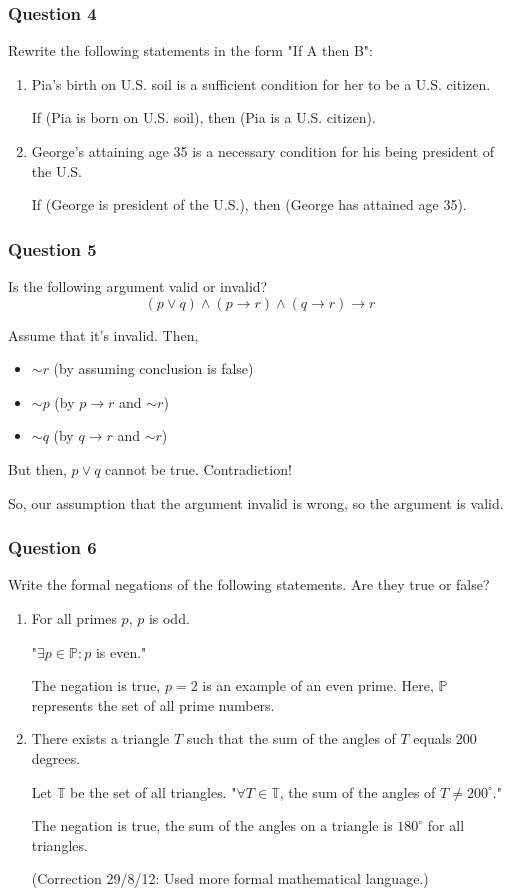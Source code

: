 \documentclass{beamer}
\newcommand{\n}{\sim}
\begin{document}
\begin{frame}
\frametitle{Question 4}
Rewrite the following statements in the form "If A then B":
\begin{enumerate}
\item
Pia's birth on U.S. soil is a sufficient condition for her to be a U.S. citizen.

\pause
If (Pia is born on U.S. soil), then (Pia is a U.S. citizen).

\pause
\item
George's attaining age 35 is a necessary condition for his being president of
the U.S.

\pause
If (George is president of the U.S.), then (George has attained age 35).
\end{enumerate}

\end{frame}

\begin{frame}
\frametitle{Question 5}
Is the following argument valid or invalid?
\[
    (p \lor q) \land (p \to r) \land (q \to r) \to r
\]

\pause
Assume that it's invalid. Then,
\begin{itemize}
\pause
\item $\n r$ (by assuming conclusion is false)
\pause
\item $\n p$ (by $p \to r$ and $\n r$)
\pause
\item $\n q$ (by $q \to r$ and $\n r$)
\end{itemize}
\pause
But then, $p \lor q$ cannot be true. Contradiction!

\pause
So, our assumption that the argument invalid is wrong, so the argument is valid.

\end{frame}

\begin{frame}
\frametitle{Question 6}
Write the formal negations of the following statements. Are they true or false?

\begin{enumerate}
\item
For all primes $p$, $p$ is odd.

\pause
"$\exists p \in \mathbb{P} : p$ is even."

The negation is true, $p = 2$ is an example of an even prime. Here,
$\mathbb{P}$ represents the set of all prime numbers.

\pause
\item
There exists a triangle $T$ such that the sum of the angles of $T$ equals 200
degrees.

\pause
Let $\mathbb{T}$ be the set of all triangles.
"$\forall T \in \mathbb{T}$, the sum of the angles of $T \neq 200^\circ$."

The negation is true, the sum of the angles on a triangle is $180^\circ$ for
all triangles.

(Correction 29/8/12: Used more formal mathematical language.)
\end{enumerate}

\end{frame}
\end{document}
